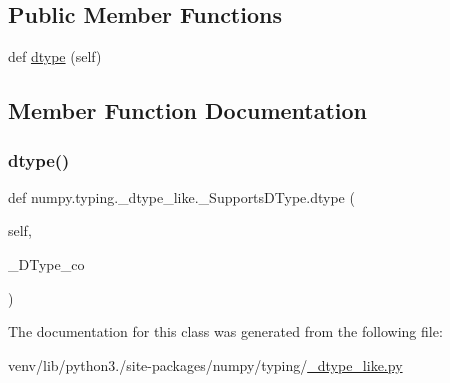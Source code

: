 \subsection*{Public Member Functions}
\begin{DoxyCompactItemize}
\item 
def \hyperlink{classnumpy_1_1typing_1_1__dtype__like_1_1__SupportsDType_ac3f79110b03536a83a80c3b0d32d3f59}{dtype} (self)
\end{DoxyCompactItemize}


\subsection{Member Function Documentation}
\mbox{\label{classnumpy_1_1typing_1_1__dtype__like_1_1__SupportsDType_ac3f79110b03536a83a80c3b0d32d3f59}} 
\subsubsection{\texorpdfstring{dtype()}{dtype()}}
{\footnotesize\ttfamily def numpy.\+typing.\+\_\+dtype\+\_\+like.\+\_\+\+Supports\+D\+Type.\+dtype (\begin{DoxyParamCaption}\item[{}]{self,  }\item[{}]{\+\_\+\+D\+Type\+\_\+co }\end{DoxyParamCaption})}



The documentation for this class was generated from the following file\+:\begin{DoxyCompactItemize}
\item 
venv/lib/python3./site-\/packages/numpy/typing/\hyperlink{__dtype__like_8py}{\+\_\+dtype\+\_\+like.\+py}\end{DoxyCompactItemize}
